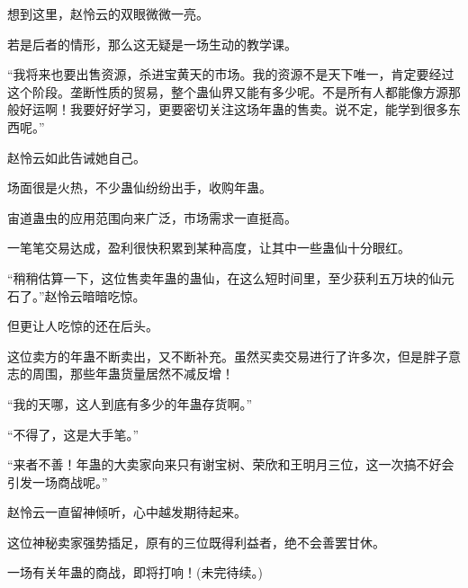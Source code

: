\begin{this_body}
想到这里，赵怜云的双眼微微一亮。

若是后者的情形，那么这无疑是一场生动的教学课。

“我将来也要出售资源，杀进宝黄天的市场。我的资源不是天下唯一，肯定要经过这个阶段。垄断性质的贸易，整个蛊仙界又能有多少呢。不是所有人都能像方源那般好运啊！我要好好学习，更要密切关注这场年蛊的售卖。说不定，能学到很多东西呢。”

赵怜云如此告诫她自己。

场面很是火热，不少蛊仙纷纷出手，收购年蛊。

宙道蛊虫的应用范围向来广泛，市场需求一直挺高。

一笔笔交易达成，盈利很快积累到某种高度，让其中一些蛊仙十分眼红。

“稍稍估算一下，这位售卖年蛊的蛊仙，在这么短时间里，至少获利五万块的仙元石了。”赵怜云暗暗吃惊。

但更让人吃惊的还在后头。

这位卖方的年蛊不断卖出，又不断补充。虽然买卖交易进行了许多次，但是胖子意志的周围，那些年蛊货量居然不减反增！

“我的天哪，这人到底有多少的年蛊存货啊。”

“不得了，这是大手笔。”

“来者不善！年蛊的大卖家向来只有谢宝树、荣欣和王明月三位，这一次搞不好会引发一场商战呢。”

赵怜云一直留神倾听，心中越发期待起来。

这位神秘卖家强势插足，原有的三位既得利益者，绝不会善罢甘休。

一场有关年蛊的商战，即将打响！(未完待续。)

\end{this_body}

